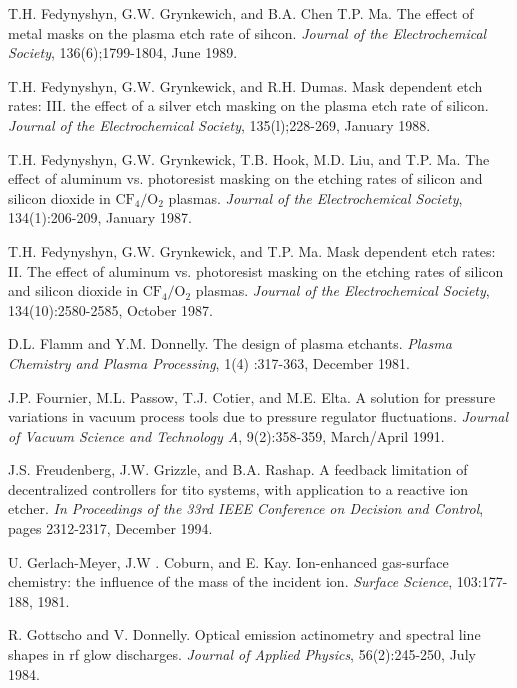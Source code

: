 \begin{thebibliography}{100}
	  T.H. Fedynyshyn, G.W. Grynkewich, and B.A. Chen T.P. Ma. The effect of metal masks on the plasma etch rate of sihcon. \emph{Journal of the Electrochemical Society}, 136(6);1799-1804, June 1989.
	
	  T.H. Fedynyshyn, G.W. Grynkewick, and R.H. Dumas. Mask dependent etch rates: III. the effect of a silver etch masking on the plasma etch rate of silicon. \emph{Journal of the Electrochemical Society}, 135(l);228-269, January 1988.

	
	 T.H. Fedynyshyn, G.W. Grynkewick, T.B. Hook, M.D. Liu, and T.P. Ma. The effect of aluminum vs. photoresist masking on the etching rates of silicon and silicon dioxide in $\text{CF}_{4}/\text{O}_{2}$ plasmas. \emph{Journal of the Electrochemical Society}, 134(1):206-209, January 1987.
	
	 T.H. Fedynyshyn, G.W. Grynkewick, and T.P. Ma. Mask dependent etch rates: II. The effect of aluminum vs. photoresist masking on the etching rates of silicon and silicon dioxide in $\text{CF}_{4}/\text{O}_{2}$ plasmas. \emph{Journal of the Electrochemical Society}, 134(10):2580-2585, October 1987.
	
	  D.L. Flamm and Y.M. Donnelly. The design of plasma etchants. \emph{Plasma Chemistry and Plasma Processing}, 1(4) :317-363, December 1981.
	
	 J.P. Fournier, M.L. Passow, T.J. Cotier, and M.E. Elta. A solution for pressure variations in vacuum process tools due to pressure regulator fluctuations. \emph{Journal of Vacuum Science and Technology A}, 9(2):358-359, March/April 1991.
	
	 J.S. Freudenberg, J.W. Grizzle, and B.A. Rashap. A feedback limitation of decentralized controllers for tito systems, with application to a reactive ion etcher. \emph{In Proceedings of the 33rd IEEE Conference on Decision and Control}, pages 2312-2317, December 1994.
	
	 U. Gerlach-Meyer, J.W . Coburn, and E. Kay. Ion-enhanced gas-surface chemistry: the influence of the mass of the incident ion. \emph{Surface Science}, 103:177-188, 1981.
	
	 R. Gottscho and V. Donnelly. Optical emission actinometry and spectral line shapes in rf glow discharges. \emph{Journal of Applied Physics}, 56(2):245-250, July 1984.
	

\end{thebibliography}
